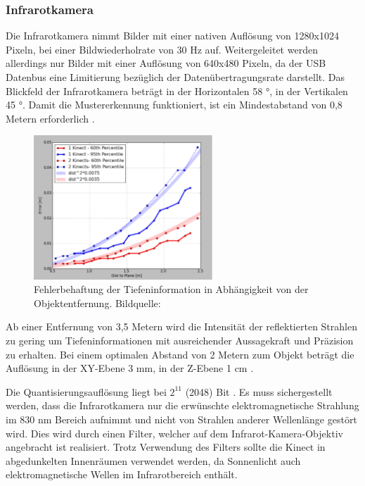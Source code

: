 \subsubsection{Infrarotkamera}
Die Infrarotkamera nimmt Bilder mit einer nativen Auflösung von 1280x1024 Pixeln, bei einer Bildwiederholrate von 30 Hz auf. Weitergeleitet werden allerdings nur Bilder mit einer Auflösung von 640x480 Pixeln, da der USB Datenbus eine Limitierung bezüglich der Datenübertragungsrate darstellt\cite{borenstein2012making}. Das Blickfeld der Infrarotkamera beträgt in der Horizontalen 58 °, in der Vertikalen 45 °. Damit die Mustererkennung funktioniert, ist ein Mindestabstand von 0,8 Metern erforderlich \cite{borenstein2012making}. \\
 \begin{figure}[!ht]
 	\begin{center}
 		\includegraphics[width=0.6\textwidth]{./Res/Res_to_Dist}
 	\end{center}
 	\caption{Fehlerbehaftung der Tiefeninformation in Abhängigkeit von der Objektentfernung. Bildquelle: \cite{kinectinfo}}
 	\label{fig:Res_to_Dist}
 \end{figure}
 
 Ab einer Entfernung von 3,5 Metern wird die Intensität der reflektierten Strahlen zu gering um Tiefeninformationen mit ausreichender Aussagekraft und Präzision zu erhalten.
Bei einem optimalen Abstand von 2 Metern zum Objekt beträgt die Auflösung 
in der XY-Ebene 3 mm, in der Z-Ebene 1 cm \cite{borenstein2012making}.





Die Quantisierungsauflösung liegt bei $2^ {11}$ (2048) Bit \cite{microsoftdocu}.
Es muss sichergestellt werden, dass die Infrarotkamera nur die erwünschte elektromagnetische Strahlung im 830 nm Bereich aufnimmt und nicht von Strahlen anderer Wellenlänge gestört wird. Dies wird durch einen Filter, welcher auf dem Infrarot-Kamera-Objektiv angebracht ist realisiert.
Trotz Verwendung des Filters sollte die Kinect in abgedunkelten Innenräumen verwendet werden, da Sonnenlicht auch elektromagnetische Wellen im Infrarotbereich enthält.

